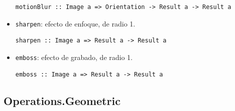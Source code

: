 \documentclass[a4paper, 11pt]{article} %
\begin{document}
\begin{itemize}
\begin{lstlisting}
motionBlur :: Image a => Orientation -> Result a -> Result a
\end{lstlisting}
		\item \texttt{sharpen}: efecto de enfoque, de radio 1.
\begin{lstlisting}
sharpen :: Image a => Result a -> Result a
\end{lstlisting}
		\item \texttt{emboss}: efecto de grabado, de radio 1.
\begin{lstlisting}
emboss :: Image a => Result a -> Result a
\end{lstlisting}

	\end{itemize}
	
\subsection*{Operations.Geometric}
\end{document}
